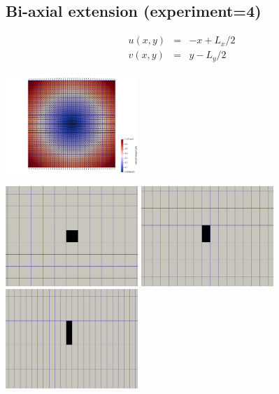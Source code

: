 \newpage
\subsection*{Bi-axial extension (experiment=4)}

\begin{eqnarray}
u(x,y)&=&-x+L_x/2 \\
v(x,y)&=&y-L_y/2
\end{eqnarray}


\begin{center}
\includegraphics[width=5cm]{python_codes/fieldstone_89/results/biaxial/vel}
\end{center}


\begin{center}
\includegraphics[width=5cm]{python_codes/fieldstone_89/results/biaxial/target0000}
\includegraphics[width=5cm]{python_codes/fieldstone_89/results/biaxial/target0005}
\includegraphics[width=5cm]{python_codes/fieldstone_89/results/biaxial/target0010}
\end{center}


